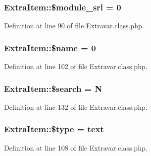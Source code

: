 \hypertarget{classExtraItem_a21cce86c0846b13228273314216e5ab9}{}
\subsubsection[{\$module\+\_\+srl}]{\setlength{\rightskip}{0pt plus 5cm}Extra\+Item\+::\$module\+\_\+srl = 0}\label{classExtraItem_a21cce86c0846b13228273314216e5ab9}


Definition at line 90 of file Extravar.\+class.\+php.

\hypertarget{classExtraItem_a32694a2408e9e2cca1d680356cf937d3}{}
\subsubsection[{\$name}]{\setlength{\rightskip}{0pt plus 5cm}Extra\+Item\+::\$name = 0}\label{classExtraItem_a32694a2408e9e2cca1d680356cf937d3}


Definition at line 102 of file Extravar.\+class.\+php.

\hypertarget{classExtraItem_a086e30bc8e2d078ad1108d00ae58a60c}{}
\subsubsection[{\$search}]{\setlength{\rightskip}{0pt plus 5cm}Extra\+Item\+::\$search = \textquotesingle{}N\textquotesingle{}}\label{classExtraItem_a086e30bc8e2d078ad1108d00ae58a60c}


Definition at line 132 of file Extravar.\+class.\+php.

\hypertarget{classExtraItem_ac965cc202d067c0449be9976045fd4be}{}
\subsubsection[{\$type}]{\setlength{\rightskip}{0pt plus 5cm}Extra\+Item\+::\$type = \textquotesingle{}text\textquotesingle{}}\label{classExtraItem_ac965cc202d067c0449be9976045fd4be}


Definition at line 108 of file Extravar.\+class.\+php.

\hypertarget{classExtraItem_a46622b49026acdfce833d5118a43986d}{}
